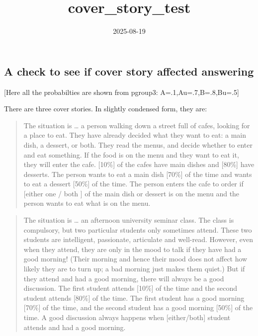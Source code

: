 \documentclass[
]{article}
\title{cover\_story\_test}
\author{}
\date{\vspace{-2.5em}2025-08-19}
\begin{document}
\maketitle

\subsection{A check to see if cover story affected
answering}\label{a-check-to-see-if-cover-story-affected-answering}

{[}Here all the probabilties are shown from pgroup3:
A=.1,Au=.7,B=.8,Bu=.5{]}

There are three cover stories. In slightly condensed form, they are:

\begin{quote}
The situation is \ldots{} a person walking down a street full of cafes,
looking for a place to eat. They have already decided what they want to
eat: a main dish, a dessert, or both. They read the menus, and decide
whether to enter and eat something. If the food is on the menu and they
want to eat it, they will enter the cafe. {[}10\%{]} of the cafes have
main dishes and {[}80\%{]} have desserts. The person wants to eat a main
dish {[}70\%{]} of the time and wants to eat a dessert {[}50\%{]} of the
time. The person enters the cafe to order if {[}either one / both {]} of
the main dish or dessert is on the menu and the person wants to eat what
is on the menu.
\end{quote}

\begin{quote}
The situation is \ldots{} an afternoon university seminar class. The
class is compulsory, but two particular students only sometimes attend.
These two students are intelligent, passionate, articulate and
well-read. However, even when they attend, they are only in the mood to
talk if they have had a good morning! (Their morning and hence their
mood does not affect how likely they are to turn up; a bad morning just
makes them quiet.) But if they attend and had a good morning, there will
always be a good discussion. The first student attends {[}10\%{]} of the
time and the second student attends {[}80\%{]} of the time. The first
student has a good morning {[}70\%{]} of the time, and the second
student has a good morning {[}50\%{]} of the time. A good discussion
always happens when {[}either/both{]} student attends and had a good
morning.
\end{quote}
\end{document}
